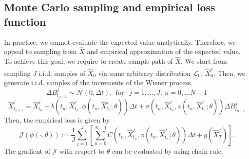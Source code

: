 \documentclass[11pt]{book}
\begin{document}
\subsection{Monte Carlo sampling and empirical loss function}
In practice, we cannot evaluate the expected value analytically. Therefore, we appeal to sampling from $\hat{X}$ and empirical approximation of the expected value. To achieve this goal, we require to create sample path of $\hat{X}$. We start from sampling $J$ i.i.d. samples of $\hat{X}_0$ via some arbitrary distribution $\mathcal{L}_0$, $\hat{X}_0^j$. Then, we generate i.i.d. samples of the increments of the Wiener process. 
\[
\Delta B_{t_{n+1}}^j\sim\mathcal{N}(0,\Delta t),~~\text{for }~~j=1,...,J,~n=0,...N-1
\]
\begin{equation}\label{eqn:discrete_euler}
\hat{X}^j_{t_{n+1}} = \hat{X}^j_{t_{n}} + b(t_{n},\hat{X}^j_{t_{n}},\phi(t_{n},\hat{X}^j_{t_{n}};\theta)) \Delta t+\sigma(t_{n},\hat{X}^j_{t_{n}},\phi(t_{n},\hat{X}^j_{t_{n}};\theta))\Delta B_{t_{n+1}}^j    
\end{equation}
Then, the empirical loss is given by
\begin{equation}\label{func:loss_empirical}
\overline{\mathcal{J}}(\phi(\cdot,\theta)):=\frac{1}{J}\sum_{j=1}^{J}\left[\sum_{n=0}^{N-1} C(t_{n},\hat{X}^j_{t_n},\phi(t_{n},\hat{X}^j_{t_{n}};\theta))\Delta t+g(\hat{X}^j_T)\right].
\end{equation}
The gradient of $\bar{\mathcal{J}}$ with respect to $\theta$ can be evaluated by using chain rule.
\begin{algorithm}
        \caption{Policy gradient method for control problems}
        \label{alg:pgm}
\end{algorithm}
\end{document}
